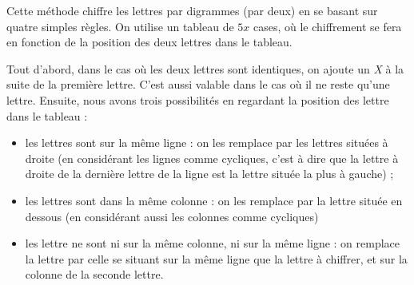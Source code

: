 Cette méthode chiffre les lettres par digrammes (par deux) en se
basant sur quatre simples règles. On utilise un tableau de $5x$ cases,
où le chiffrement se fera en fonction de la position des deux lettres
dans le tableau.  

Tout d'abord, dans le cas où les deux lettres sont
identiques, on ajoute un \emph{X} à la suite de la première
lettre. C'est aussi valable dans le cas où il ne reste qu'une lettre.
Ensuite, nous avons trois possibilités en regardant la position des
lettre dans le tableau : 
\begin{itemize}
  \item les lettres sont sur la même ligne : on les remplace par les
    lettres situées à droite (en considérant les lignes comme
    cycliques, c'est à dire que la lettre à droite de la dernière
    lettre de la ligne est la lettre située la plus à gauche) ; 
  \item les lettres sont dans la même colonne : on les remplace par la
    lettre située en dessous (en considérant aussi les colonnes comme
    cycliques)
  \item les lettre ne sont ni sur la même colonne, ni sur la même
    ligne : on remplace la lettre par celle se situant sur la même
    ligne que la lettre à chiffrer, et sur la colonne de la seconde
    lettre.
\end{itemize}

